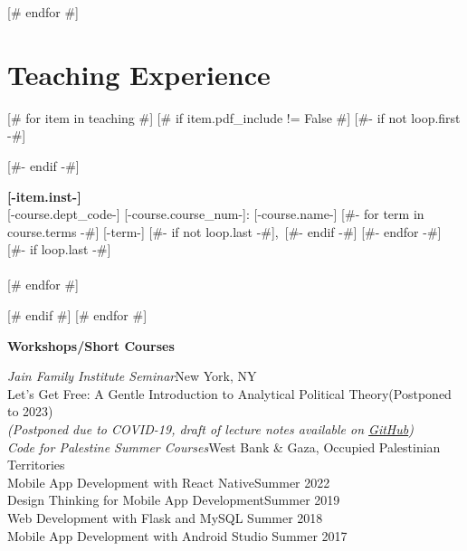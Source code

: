 \documentclass[letterpaper,11pt]{article}
\begin{document}
[# endfor #]


\vspace{5mm}
\noindent\begin{minipage}{\textwidth}
\section{Teaching Experience}

[# for item in teaching #]
    [# if item.pdf_include != False #]
    [#- if not loop.first -#]
        \noindent\begin{minipage}{\textwidth}
    [#- endif -#]

        \noindent\textbf{[-item.inst-]}\vspace{2mm}\\
        [# for course in item.courses #]
            [-course.dept_code-] [-course.course_num-]: [-course.name-]\hfill{}
            [#- for term in course.terms -#]
                [-term-]
                [#- if not loop.last -#],~[#- endif -#]
            [#- endfor -#]
            [#- if loop.last -#]
                \vspace{2mm} \\
            [#- else -#]
                \vspace{1mm}\\
            [#- endif -#]
        [# endfor #]
    \end{minipage}
    [# endif #]
[# endfor #]

\textbf{Workshops/Short Courses}\vspace{2mm}
	
	\textit{Jain Family Institute Seminar}\hfill New York, NY\vspace{2mm}\\
	Let's Get Free: A Gentle Introduction to Analytical Political Theory\hfill (Postponed to 2023)\vspace{1mm}\\
	\-\hspace{8mm}\textit{\small (Postponed due to COVID-19, draft of lecture notes available on \href{https://github.com/jpowerj/lets-get-free}{GitHub})}\vspace{2mm}\\

\textit{Code for Palestine Summer Courses}\hfill West Bank \& Gaza, Occupied Palestinian Territories\vspace{2mm}\\
Mobile App Development with React Native\hfill Summer 2022\vspace{1mm}\\
Design Thinking for Mobile App Development\hfill Summer 2019\vspace{1mm}\\
Web Development with Flask and MySQL \hfill Summer 2018\vspace{1mm}\\
Mobile App Development with Android Studio \hfill Summer 2017\vspace{2mm}\\


\end{minipage}
\end{document}
